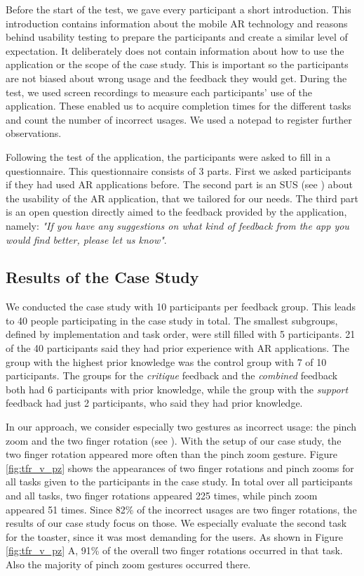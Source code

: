 \documentclass[11pt, a4paper]{article}
\begin{document}
			Before the start of the test, we gave every participant a short introduction. This introduction contains information about the mobile \ac{AR} technology and reasons behind usability testing to prepare the participants and create a similar level of expectation. It deliberately does not contain information about how to use the application or the scope of the case study. This is important so the participants are not biased about wrong usage and the feedback they would get. During the test, we used screen recordings to measure each participants' use of the application. These enabled us to acquire completion times for the different tasks and count the number of incorrect usages. We used a notepad to register further observations.

			Following the test of the application, the participants were asked to fill in a questionnaire. This questionnaire consists of 3 parts. First we asked participants if they had used \ac{AR} applications before. The second part is an \ac{SUS} (see ) about the usability of the \ac{AR} application, that we tailored for our needs. The third part is an open question directly aimed to the feedback provided by the application, namely: \emph{"If you have any suggestions on what kind of feedback from the app you would find better, please let us know"}.

		\subsection*{Results of the Case Study}\label{ssec:results}
			We conducted the case study with 10 participants per feedback group. This leads to 40 people participating in the case study in total. The smallest subgroups, defined by implementation and task order, were still filled with 5 participants. 21 of the 40 participants said they had prior experience with \ac{AR} applications. The group with the highest prior knowledge was the control group with 7 of 10 participants. The groups for the \emph{critique} feedback and the \emph{combined} feedback both had 6 participants with prior knowledge, while the group with the \emph{support} feedback had just 2 participants, who said they had prior knowledge.

			In our approach, we consider especially two gestures as incorrect usage: the pinch zoom and the two finger rotation (see ). With the setup of our case study, the two finger rotation appeared more often than the pinch zoom gesture. Figure \ref{fig:tfr_v_pz} shows the appearances of two finger rotations and pinch zooms for all tasks given to the participants in the case study. In total over all participants and all tasks, two finger rotations appeared 225 times, while pinch zoom appeared 51 times. Since 82\% of the incorrect usages are two finger rotations, the results of our case study focus on those. We especially evaluate the second task for the toaster, since it was most demanding for the users. As shown in Figure \ref{fig:tfr_v_pz} A, 91\% of the overall two finger rotations occurred in that task. Also the majority of pinch zoom gestures occurred there.
\end{document}
